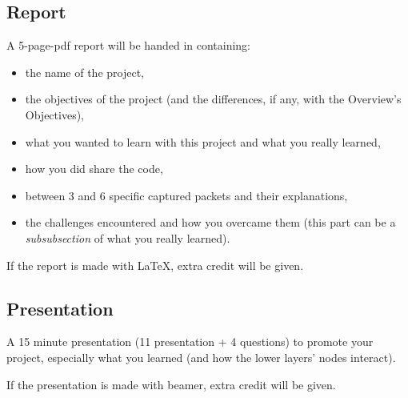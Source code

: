 \documentclass[11pt]{article}
\begin{document}
\subsection{Report}
A 5-page-pdf report will be handed in containing:
  \begin{itemize}
    \item the name of the project,
    \item the objectives of the project (and the differences, if any, with the Overview's Objectives),
    \item what you wanted to learn with this project and what you really learned,
    \item how you did share the code,
    \item between 3 and 6 specific captured packets and their explanations,
    \item the challenges encountered and how you overcame them (this part can be a \emph{subsubsection} of what you really learned).
  \end{itemize}
If the report is made with \LaTeX, extra credit will be given.

\subsection{Presentation}
A 15 minute presentation (11 presentation + 4 questions) to promote your project, especially what you learned (and how the lower layers' nodes interact).

If the presentation is made with beamer, extra credit will be given.
\end{document}
